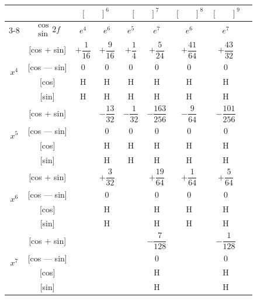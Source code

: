 \documentclass[11pt,a4paper]{book}
\begin{document}
\vspace{1em}


\begin{center}
\small
\begin{tabular}{|c|c|c|c|c|c|c|c|c|}
\hline
& & \multicolumn{2}{c|}{$[\phantom{()}]^6$} & \multicolumn{2}{c|}{$[\phantom{()}]^7$} & \multicolumn{1}{c|}{$[\phantom{()}]^8$} & \multicolumn{1}{c|}{$[\phantom{()}]^9$} \\
\cline{3-8}
& $\begin{smallmatrix} \cos \\ \sin \end{smallmatrix} 2f$ & $e^4$ & $e^6$ & $e^5$ & $e^7$ & $e^6$ & $e^7$ \\
\hline
\multirow{4}{*}{$x^4$} & [cos + sin] & $+\dfrac{1}{16}$ & $+\dfrac{9}{16}$ & $+\dfrac{1}{4}$ & $+\dfrac{5}{24}$ & $+\dfrac{41}{64}$ & $+\dfrac{43}{32}$ \\
& [cos --- sin] & $0$ & $0$ & $0$ & $0$ & $0$ & $0$ \\
& [cos] & H & H & H & H & H & H \\
& [sin] & H & H & H & H & H & H \\
\hline
\multirow{4}{*}{$x^5$} & [cos + sin] & & $-\dfrac{13}{32}$ & $-\dfrac{1}{32}$ & $-\dfrac{163}{256}$ & $-\dfrac{9}{64}$ & $-\dfrac{101}{256}$ \\
& [cos --- sin] & & $0$ & $0$ & $0$ & $0$ & $0$ \\
& [cos] & & H & H & H & H & H \\
& [sin] & & H & H & H & H & H \\
\hline
\multirow{4}{*}{$x^6$} & [cos + sin] & & $+\dfrac{3}{32}$ & & $+\dfrac{19}{64}$ & $+\dfrac{1}{64}$ & $+\dfrac{5}{64}$ \\
& [cos --- sin] & & $0$ & & $0$ & $0$ & $0$ \\
& [cos] & & H & & H & H & H \\
& [sin] & & H & & H & H & H \\
\hline
\multirow{4}{*}{$x^7$} & [cos + sin] & & & & $-\dfrac{7}{128}$ & & $-\dfrac{1}{128}$ \\
& [cos --- sin] & & & & $0$ & & $0$ \\
& [cos] & & & & H & & H \\
& [sin] & & & & H & & H \\
\hline
\end{tabular}
\end{center}
\end{document}
